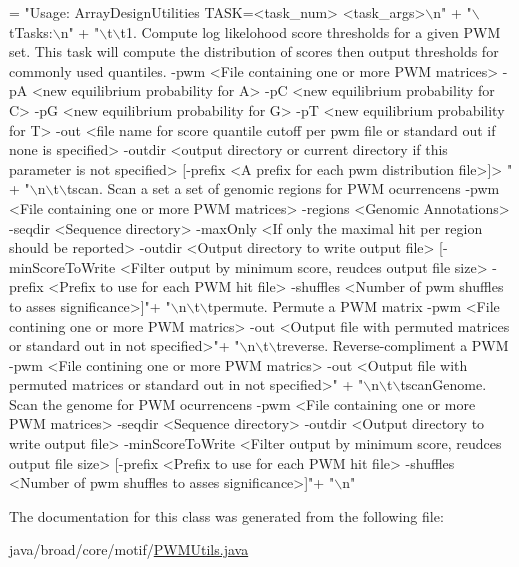 \begin{DoxyCode}
= \textcolor{stringliteral}{"Usage: ArrayDesignUtilities TASK=<task\_num> <task\_args>\(\backslash\)n"} +
    \textcolor{stringliteral}{"\(\backslash\)tTasks:\(\backslash\)n"} +
    \textcolor{stringliteral}{"\(\backslash\)t\(\backslash\)t1. Compute log likelohood score thresholds for a given PWM set. This task will compute the
       distribution of scores then output thresholds for commonly used quantiles. -pwm <File containing one or more PWM
       matrices> -pA <new equilibrium probability for A>  -pC <new equilibrium probability for C>  -pG <new
       equilibrium probability for G>  -pT <new equilibrium probability for T> -out <file name for score quantile cutoff per
       pwm file or standard out if none is specified> -outdir <output directory or current directory if this
       parameter is not specified> [-prefix <A prefix for each pwm distribution file>]> "} +
    \textcolor{stringliteral}{"\(\backslash\)n\(\backslash\)t\(\backslash\)tscan. Scan a set a set of genomic regions for PWM ocurrencens -pwm <File containing one or more
       PWM matrices> -regions <Genomic Annotations> -seqdir <Sequence directory> -maxOnly <If only the maximal hit
       per region should be reported> -outdir <Output directory to write output file> [-minScoreToWrite <Filter
       output by minimum score, reudces output file size> -prefix <Prefix to use for each PWM hit file> -shuffles
       <Number of pwm shuffles to asses significance>]"}+
    \textcolor{stringliteral}{"\(\backslash\)n\(\backslash\)t\(\backslash\)tpermute. Permute a PWM matrix -pwm <File contining one or more PWM matrics> -out <Output file
       with permuted matrices or standard out in not specified>"}+
    \textcolor{stringliteral}{"\(\backslash\)n\(\backslash\)t\(\backslash\)treverse. Reverse-compliment a PWM -pwm <File contining one or more PWM matrics> -out <Output
       file with permuted matrices or standard out in not specified>"} +
    \textcolor{stringliteral}{"\(\backslash\)n\(\backslash\)t\(\backslash\)tscanGenome. Scan the genome for PWM ocurrencens -pwm <File containing one or more PWM matrices>
       -seqdir <Sequence directory> -outdir <Output directory to write output file> -minScoreToWrite <Filter output
       by minimum score, reudces output file size> [-prefix <Prefix to use for each PWM hit file> -shuffles
       <Number of pwm shuffles to asses significance>]"}+
    \textcolor{stringliteral}{"\(\backslash\)n"}
\end{DoxyCode}


The documentation for this class was generated from the following file\+:\begin{DoxyCompactItemize}
\item 
java/broad/core/motif/\hyperlink{_p_w_m_utils_8java}{P\+W\+M\+Utils.\+java}\end{DoxyCompactItemize}
